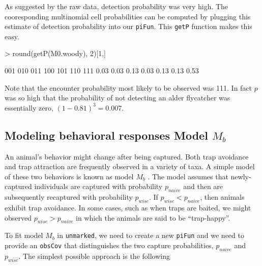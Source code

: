 \documentclass[a4paper]{article}
\renewenvironment{Schunk}{\vspace{\topsep}}{\vspace{\topsep}}
\begin{document}
As suggested by the raw data, detection probability was very high. The
cooresponding multinomial cell probabilities can be computed by
plugging this estimate of detection probability into our
\texttt{piFun}. This \texttt{getP} function makes this easy.

\begin{Schunk}
\begin{Sinput}
> round(getP(M0.woody), 2)[1,]
\end{Sinput}
\begin{Soutput}
 001  010  011  100  101  110  111 
0.03 0.03 0.13 0.03 0.13 0.13 0.53 
\end{Soutput}
\end{Schunk}

Note that the encounter probability most likely to be observed was
111. In fact $p$ was so high that the probability of not detecting an
alder flycatcher was essentially zero, $(1-0.81)^3 = 0.007$.



\subsection{Modeling behavioral responses Model $M_b$}

An animal's behavior might change after being captured. Both
trap avoidance and trap attraction are frequently
observed in a variety of taxa. A simple model of these two behaviors
is known as model $M_b$ \citep{otis_etal:1978}. The model assumes that
newly-captured individuals are captured with probability $p_{naive}$
and then are subsequently recaptured with probability $p_{wise}$. If
$p_{wise} < p_{naive}$, then animals exhibit trap avoidance. In some
cases, such as when traps are baited, we might observed $p_{wise} >
p_{naive}$ in which the animals are said to be ``trap-happy''.

To fit model $M_b$ in \texttt{unmarked}, we need to create a new
\texttt{piFun} and we need to provide an \texttt{obsCov} that
distinguishes the two capture probabilities, $p_{naive}$ and
$p_{wise}$. The simplest possible approach is the following
\end{document}
